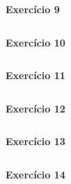 \documentclass[12pt,a4paper]{article}
\begin{document}
\noindent \textbf{Exercício 9}

\begin{verbatim}
\end{verbatim}

\noindent \textbf{Exercício 10}

\begin{verbatim}
\end{verbatim}

\noindent \textbf{Exercício 11}

\begin{verbatim}
\end{verbatim}

\noindent \textbf{Exercício 12}

\begin{verbatim}
\end{verbatim}

\noindent \textbf{Exercício 13}

\begin{verbatim}
\end{verbatim}

\noindent \textbf{Exercício 14}

\begin{verbatim}
\end{verbatim}
\end{document}
